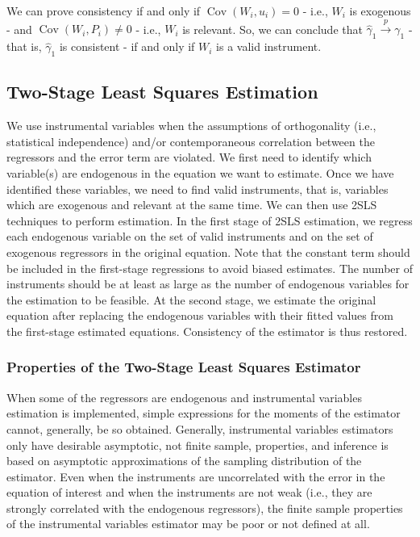 We can prove consistency if and only if $\operatorname{Cov}\left(W_{i}, u_{i}\right)=0$ - i.e., $W_{i}$ is exogenous - and $\operatorname{Cov}\left(W_{i}, P_{i}\right) \neq 0$ - i.e., $W_{i}$ is relevant. So, we can conclude that $\widehat{\gamma}_{1} \xrightarrow{p} \gamma_{1}$ - that is, $\widehat{\gamma}_{1}$ is consistent - if and only if $W_{i}$ is a valid instrument.

\subsection{Two-Stage Least Squares Estimation}
We use instrumental variables when the assumptions of orthogonality (i.e., statistical independence) and/or contemporaneous correlation between the regressors and the error term are violated. We first need to identify which variable(s) are endogenous in the equation we want to estimate. Once we have identified these variables, we need to find valid instruments, that is, variables which are exogenous and relevant at the same time. We can then use 2SLS techniques to perform estimation. In the first stage of 2SLS estimation, we regress each endogenous variable on the set of valid instruments and on the set of exogenous regressors in the original equation. Note that the constant term should be included in the first-stage regressions to avoid biased estimates. The number of instruments should be at least as large as the number of endogenous variables for the estimation to be feasible. At the second stage, we estimate the original equation after replacing the endogenous variables with their fitted values from the first-stage estimated equations. Consistency of the estimator is thus restored.

\subsubsection{Properties of the Two-Stage Least Squares Estimator}
When some of the regressors are endogenous and instrumental variables estimation is implemented, simple expressions for the moments of the estimator cannot, generally, be so obtained. Generally, instrumental variables estimators only have desirable asymptotic, not finite sample, properties, and inference is based on asymptotic approximations of the sampling distribution of the estimator. Even when the instruments are uncorrelated with the error in the equation of interest and when the instruments are not weak (i.e., they are strongly correlated with the endogenous regressors), the finite sample properties of the instrumental variables estimator may be poor or not defined at all.

